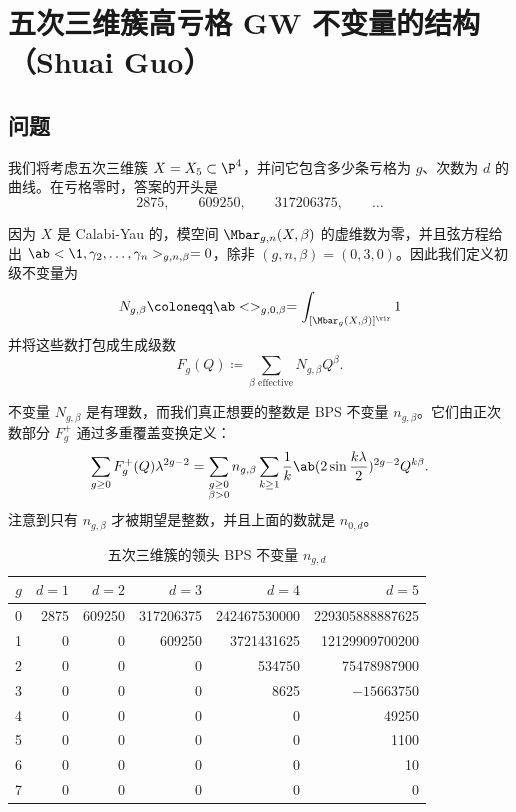 \section{五次三维簇高亏格 GW 不变量的结构（Shuai Guo）}%
\label{sec:Structure of higher-genus GW invariants of the quintic (Shuai Guo)}

\subsection{问题}%
\label{sub:The problem (Guo)}

我们将考虑五次三维簇 \(X = X_5 \subset \P^4\)，并问它包含多少条亏格为 \(g\)、次数为 \(d\) 的曲线。在亏格零时，答案的开头是
\[ 2875, \qquad 609250, \qquad 317206375, \qquad \ldots \]

因为 \(X\) 是 Calabi-Yau 的，模空间 \(\Mbar_{g,n}(X,\beta)\) 的虚维数为零，并且弦方程给出 \(\ab<\1, \gamma_2, \ldots, \gamma_n>_{g,n,\beta} = 0\)，除非 \((g,n,\beta) = (0,3,0)\)。因此我们定义初级不变量为
\[ N_{g,\beta} \coloneqq \ab<>_{g,0,\beta} = \int_{[\Mbar_g(X,\beta)]^{\vir}} 1 \]
并将这些数打包成生成级数
\[ F_g(Q) \coloneqq \sum_{\beta \text{ effective}} N_{g,\beta}Q^{\beta}. \]

不变量 \(N_{g,\beta}\) 是有理数，而我们真正想要的整数是 BPS 不变量 \(n_{g,\beta}\)。它们由正次数部分 \(F_g^+\) 通过多重覆盖变换定义：
\[ \sum_{g \geq 0} F_g^+(Q)\lambda^{2g-2} = \sum_{\substack{g \geq 0 \\ \beta > 0}} n_{g,\beta} \sum_{k \geq 1} \frac{1}{k} \ab(2 \sin \frac{k\lambda}{2})^{2g-2}Q^{k\beta}. \]
注意到只有 \(n_{g,\beta}\) 才被期望是整数，并且上面的数就是 \(n_{0,d}\)。

\begin{table}[htpb]
    \centering
    \caption{五次三维簇的领头 BPS 不变量 \(n_{g,d}\)}
    \label{tab:quinticbps}
    \begin{tabular}{crrrrr}
        \toprule
        \(g\) & \(d=1\) & \(d=2\) & \(d=3\) & \(d=4\) & \(d=5\) \\
        \midrule
        0 & 2875 & 609250 & 317206375 & 242467530000 & 229305888887625 \\
        1 & 0 & 0 & 609250 & 3721431625 & 12129909700200 \\
        2 & 0 & 0 & 0 & 534750 & 75478987900 \\
        3 & 0 & 0 & 0 & 8625 & \(-15663750\) \\
        4 & 0 & 0 & 0 & 0 & 49250 \\
        5 & 0 & 0 & 0 & 0 & 1100 \\
        6 & 0 & 0 & 0 & 0 & 10 \\
        7 & 0 & 0 & 0 & 0 & 0 \\
        \bottomrule
    \end{tabular}
\end{table}

